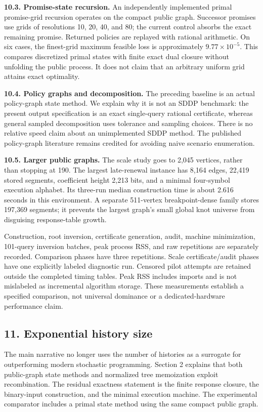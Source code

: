 \documentclass[
  11pt,
]{article}
\begin{document}
\textbf{10.3. Promise-state recursion.} An independently implemented
primal promise-grid recursion operates on the compact public graph.
Successor promises use grids of resolutions 10, 20, 40, and 80; the
current control absorbs the exact remaining promise. Returned policies
are replayed with rational arithmetic. On six cases, the finest-grid
maximum feasible loss is approximately \(9.77\times10^{-5}\). This
compares discretized primal states with finite exact dual closure
without unfolding the public process. It does not claim that an
arbitrary uniform grid attains exact optimality.

\textbf{10.4. Policy graphs and decomposition.} The preceding baseline
is an actual policy-graph state method. We explain why it is not an SDDP
benchmark: the present output specification is an exact single-query
rational certificate, whereas general sampled decomposition uses
tolerance and sampling choices. There is no relative speed claim about
an unimplemented SDDP method. The published policy-graph literature
remains credited for avoiding naive scenario enumeration.

\textbf{10.5. Larger public graphs.} The scale study goes to 2,045
vertices, rather than stopping at 190. The largest late-renewal instance
has 8,164 edges, 22,419 stored segments, coefficient height 2,213 bits,
and a minimal four-symbol execution alphabet. Its three-run median
construction time is about 2.616 seconds in this environment. A separate
511-vertex breakpoint-dense family stores 197,369 segments; it prevents
the largest graph's small global knot universe from disguising
response-table growth.

Construction, root inversion, certificate generation, audit, machine
minimization, 101-query inversion batches, peak process RSS, and raw
repetitions are separately recorded. Comparison phases have three
repetitions. Scale certificate/audit phases have one explicitly labeled
diagnostic run. Censored pilot attempts are retained outside the
completed timing tables. Peak RSS includes imports and is not mislabeled
as incremental algorithm storage. These measurements establish a
specified comparison, not universal dominance or a dedicated-hardware
performance claim.

\subsection{11. Exponential history
size}\label{exponential-history-size}

The main narrative no longer uses the number of histories as a surrogate
for outperforming modern stochastic programming. Section 2 explains that
both public-graph state methods and normalized tree memoization exploit
recombination. The residual exactness statement is the finite response
closure, the binary-input construction, and the minimal execution
machine. The experimental comparator includes a primal state method
using the same compact public graph.
\end{document}
